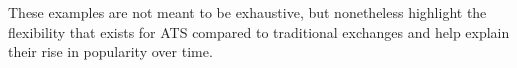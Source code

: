 These examples are not meant to be exhaustive, but nonetheless highlight the flexibility that exists for ATS compared to traditional exchanges and help explain their rise in popularity over time.

















